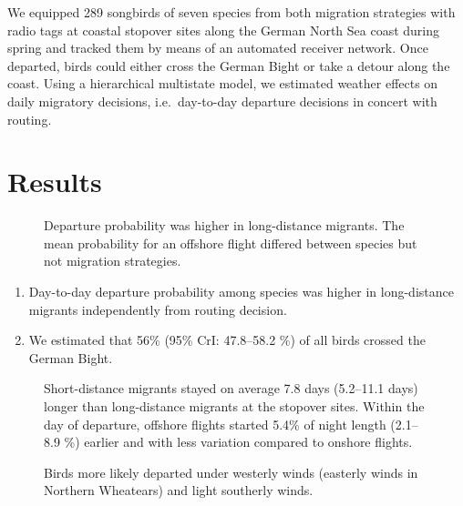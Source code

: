 \documentclass[
]{article}
\providecommand{\tightlist}{%
  \setlength{\itemsep}{0pt}\setlength{\parskip}{0pt}}
\begin{document}
We equipped 289 songbirds of seven species from both migration
strategies with radio tags at coastal stopover sites along the German
North Sea coast during spring and tracked them by means of an automated
receiver network. Once departed, birds could either cross the German
Bight or take a detour along the coast. Using a hierarchical multistate
model, we estimated weather effects on daily migratory decisions,
i.e.~day-to-day departure decisions in concert with routing.

\newpage

\hypertarget{results}{%
\section{Results}\label{results}}

\begin{figure}
\centering

\caption{Departure probability was higher in long-distance migrants. The
mean probability for an offshore flight differed between species but not
migration strategies.}
\end{figure}

\begin{enumerate}
\def\labelenumi{\arabic{enumi}.}
\tightlist
\item
  Day-to-day departure probability among species was higher in
  long-distance migrants independently from routing decision.
\item
  We estimated that 56\% (95\% CrI: 47.8--58.2 \%) of all birds crossed
  the German Bight.
\end{enumerate}

\begin{figure}
\centering

\caption{Short-distance migrants stayed on average 7.8 days (5.2--11.1
days) longer than long-distance migrants at the stopover sites. Within
the day of departure, offshore flights started 5.4\% of night length
(2.1--8.9 \%) earlier and with less variation compared to onshore
flights.}
\end{figure}

\begin{figure}
\centering

\caption{Birds more likely departed under westerly winds (easterly winds
in Northern Wheatears) and light southerly winds.}
\end{figure}
\end{document}
